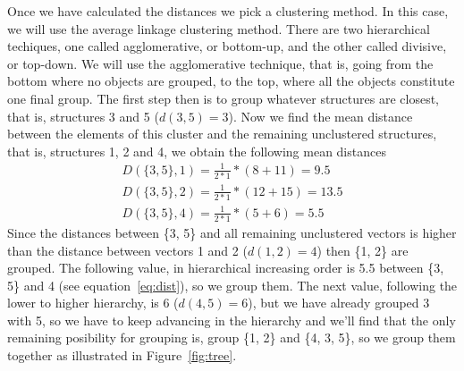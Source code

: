 Once we have calculated the distances we pick a clustering method.  In
this case,  we will use  the average linkage clustering  method. There
are   two  hierarchical  techiques,   one  called   agglomerative,  or
bottom-up, and the other called divisive, or top-down. We will use the
agglomerative  technique, that  is,  going from  the  bottom where  no
objects are grouped, to the  top, where all the objects constitute one
final group. The  first step then is to  group whatever structures are
closest, that  is, structures 3 and  5 ($d(3, 5)=3$). Now  we find the
mean distance between  the elements of this cluster  and the remaining
unclustered structures, that is, structures  1, 2 and 4, we obtain the
following mean distances
\begin{gather}
D(\{3,5\}, 1)=\frac{1}{2*1}*(8+11) = 9.5 \\
D(\{3,5\}, 2)=\frac{1}{2*1}*(12+15) = 13.5\\
D(\{3,5\}, 4)=\frac{1}{2*1}*(5+6) = 5.5 \label{eq:dist}
\end{gather}
Since  the distances between  \{3, 5\}  and all  remaining unclustered
vectors is  higher than  the distance between  vectors 1 and  2 ($d(1,
2)=4$) then \{1, 2\} are grouped. The following value, in hierarchical
increasing   order   is   5.5    between   \{3,   5\}   and   4   (see
equation~\ref{eq:dist}), so  we group them. The  next value, following
the lower to higher hierarchy, is 6 ($d(4, 5)=6$), but we have already
grouped 3  with 5, so we have  to keep advancing in  the hierarchy and
we'll find that  the only remaining posibility for  grouping is, group
\{1, 2\} and \{4, 3, 5\},  so we group them together as illustrated in
Figure~\ref{fig:tree}.
